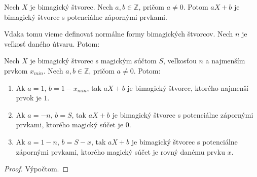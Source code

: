 \begin{consequence} Nech $X$ je bimagický štvorec. Nech $a,b \in \mathbb{Z}$, pričom $a \neq 0$. Potom $aX + b$ je bimagický štvorec s potenciálne zápornými prvkami.
\end{consequence}

Vďaka tomu vieme definovať normálne formy bimagických štvorcov. Nech $n$ je veľkosť daného útvaru. Potom:

\begin{theorem}
\label{5x5bimagic1}
Nech $X$ je bimagický štvorec s magickým súčtom $S$, veľkosťou $n$ a najmenším prvkom $x_{min}$. Nech $a,b \in \mathbb{Z}$, pričom $a \neq 0$. Potom:
\begin{enumerate}
\item Ak $a = 1$, $b = 1 - x_{min}$, tak $aX+b$ je bimagický štvorec, ktorého najmenší prvok je $1$.
\item Ak $a = -n$, $b = S$, tak $aX+b$ je bimagický štvorec s potenciálne zápornými prvkami, ktorého magický súčet je $0$.
\item Ak $a = 1-n$, $b = S-x$, tak $aX+b$ je bimagický štvorec s potenciálne zápornými prvkami, ktorého magický súčet je rovný danému prvku $x$.
\end{enumerate}
\end{theorem}

\begin{proof}
Výpočtom.
\end{proof}


